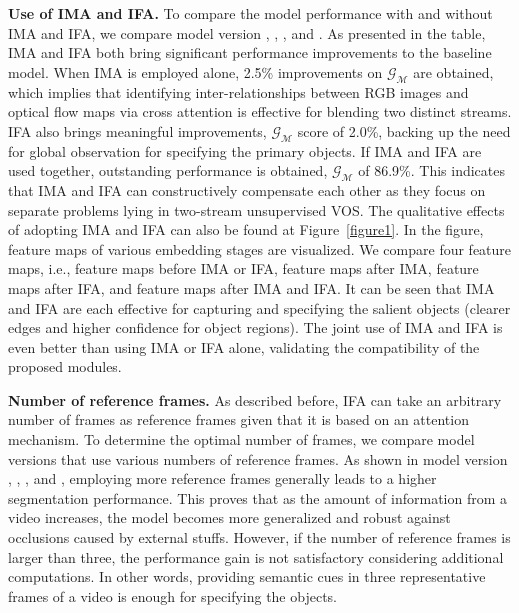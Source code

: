 \documentclass[10pt,twocolumn,letterpaper]{article}
\begin{document}
\noindent\textbf{Use of IMA and IFA.} To compare the model performance with and without IMA and IFA, we compare model version , , , and . As presented in the table, IMA and IFA both bring significant performance improvements to the baseline model. When IMA is employed alone, 2.5\% improvements on $\mathcal{G}_\mathcal{M}$ are obtained, which implies that identifying inter-relationships between RGB images and optical flow maps via cross attention is effective for blending two distinct streams. IFA also brings meaningful improvements, $\mathcal{G}_\mathcal{M}$ score of 2.0\%, backing up the need for global observation for specifying the primary objects. If IMA and IFA are used together, outstanding performance is obtained, $\mathcal{G}_\mathcal{M}$ of 86.9\%. This indicates that IMA and IFA can constructively compensate each other as they focus on separate problems lying in two-stream unsupervised VOS. The qualitative effects of adopting IMA and IFA can also be found at Figure~\ref{figure1}. In the figure, feature maps of various embedding stages are visualized. We compare four feature maps, i.e., feature maps before IMA or IFA, feature maps after IMA, feature maps after IFA, and feature maps after IMA and IFA. It can be seen that IMA and IFA are each effective for capturing and specifying the salient objects (clearer edges and higher confidence for object regions). The joint use of IMA and IFA is even better than using IMA or IFA alone, validating the compatibility of the proposed modules.  


\vspace{1mm}
\noindent\textbf{Number of reference frames.} As described before, IFA can take an arbitrary number of frames as reference frames given that it is based on an attention mechanism. To determine the optimal number of frames, we compare model versions that use various numbers of reference frames. As shown in model version , , , and , employing more reference frames generally leads to a higher segmentation performance. This proves that as the amount of information from a video increases, the model becomes more generalized and robust against occlusions caused by external stuffs. However, if the number of reference frames is larger than three, the performance gain is not satisfactory considering additional computations. In other words, providing semantic cues in three representative frames of a video is enough for specifying the objects.
\end{document}
